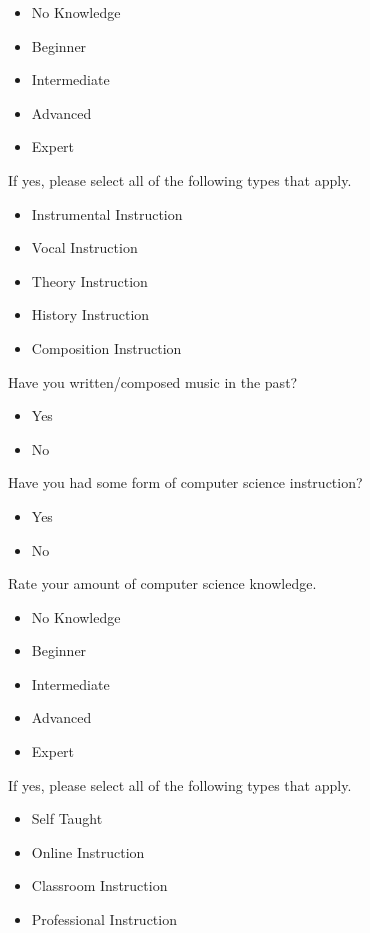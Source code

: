 \begin{itemize}
	\item No Knowledge
	\item Beginner
	\item Intermediate
	\item Advanced
	\item Expert
\end{itemize}

\noindent If yes, please select all of the following types that apply.

\begin{itemize}
	\item Instrumental Instruction
	\item Vocal Instruction
	\item Theory Instruction
	\item History Instruction
	\item Composition Instruction
\end{itemize}

\noindent Have you written/composed music in the past?

\begin{itemize}
	\item Yes
	\item No
\end{itemize}

\noindent Have you had some form of computer science instruction?

\begin{itemize}
	\item Yes
	\item No
\end{itemize}

\noindent Rate your amount of computer science knowledge.

\begin{itemize}
	\item No Knowledge
	\item Beginner
	\item Intermediate
	\item Advanced
	\item Expert
\end{itemize}

\noindent If yes, please select all of the following types that apply.

\begin{itemize}
	\item Self Taught
	\item Online Instruction
	\item Classroom Instruction
	\item Professional Instruction
\end{itemize}

